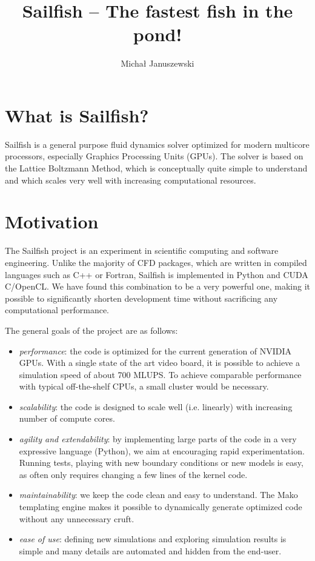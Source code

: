\documentclass{article}
\begin{document}
\title{Sailfish -- The fastest fish in the pond!}
\author{Michał Januszewski}

\maketitle

\section{What is Sailfish?}

Sailfish is a general purpose fluid dynamics solver optimized for modern multicore processors,
especially Graphics Processing Units (GPUs).  The solver is based on the Lattice Boltzmann Method,
which is conceptually quite simple to understand and which scales very well with increasing
computational resources.

\section{Motivation}

The Sailfish project is an experiment in scientific computing and software engineering.
Unlike the majority of CFD packages, which are written in compiled languages such as C++
or Fortran, Sailfish is implemented in Python and CUDA C/OpenCL.  We have found this
combination to be a very powerful one, making it possible to significantly shorten
development time without sacrificing any computational performance.

The general goals of the project are as follows:
\begin{itemize}
	\item \emph{performance}: the code is optimized for the current generation of NVIDIA GPUs.
		With a single state of the art video board, it is possible to achieve a simulation speed
		of about 700 MLUPS.  To achieve comparable performance with typical off-the-shelf CPUs,
		a small cluster would be necessary.

	\item \emph{scalability}: the code is designed to scale well (i.e. linearly) with
		increasing number of compute cores.

	\item \emph{agility and extendability}: by implementing large parts of the code in a very
		expressive language (Python), we aim at encouraging rapid experimentation.
		Running tests, playing with new boundary conditions or new models is easy, as
		often only requires changing a few lines of the kernel code.

	\item \emph{maintainability}: we keep the code clean and easy to understand.  The Mako
		templating engine makes it possible to dynamically generate optimized code without
		any unnecessary cruft.

	\item \emph{ease of use}: defining new simulations and exploring simulation results is
		simple and many details are automated and hidden from the end-user.
\end{itemize}
\end{document}
